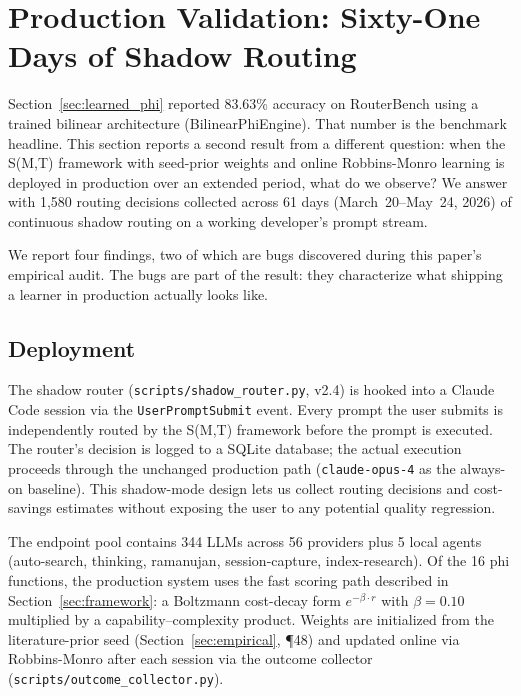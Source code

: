 \section{Production Validation: Sixty-One Days of Shadow Routing}
\label{sec:production_validation}

Section~\ref{sec:learned_phi} reported 83.63\% accuracy on RouterBench using a trained bilinear architecture (BilinearPhiEngine). That number is the benchmark headline. This section reports a second result from a different question: when the S(M,T) framework with seed-prior weights and online Robbins-Monro learning is deployed in production over an extended period, what do we observe? We answer with 1{,}580 routing decisions collected across 61 days (March~20--May~24, 2026) of continuous shadow routing on a working developer's prompt stream.

We report four findings, two of which are bugs discovered during this paper's empirical audit. The bugs are part of the result: they characterize what shipping a learner in production actually looks like.

\subsection{Deployment}

The shadow router (\texttt{scripts/shadow\_router.py}, v2.4) is hooked into a Claude Code session via the \texttt{UserPromptSubmit} event. Every prompt the user submits is independently routed by the S(M,T) framework before the prompt is executed. The router's decision is logged to a SQLite database; the actual execution proceeds through the unchanged production path (\texttt{claude-opus-4} as the always-on baseline). This shadow-mode design lets us collect routing decisions and cost-savings estimates without exposing the user to any potential quality regression.

The endpoint pool contains 344 LLMs across 56 providers plus 5 local agents (auto-search, thinking, ramanujan, session-capture, index-research). Of the 16 phi functions, the production system uses the fast scoring path described in Section~\ref{sec:framework}: a Boltzmann cost-decay form $e^{-\beta \cdot r}$ with $\beta = 0.10$ multiplied by a capability--complexity product. Weights are initialized from the literature-prior seed (Section~\ref{sec:empirical}, ¶48) and updated online via Robbins-Monro after each session via the outcome collector (\texttt{scripts/outcome\_collector.py}).

